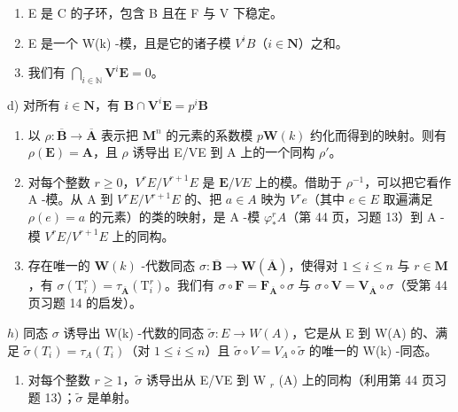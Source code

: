\begin{enumerate}
\def\labelenumi{\alph{enumi})}
\item
  E 是 C 的子环，包含 B 且在 F 与 V 下稳定。
\item
  E 是一个 W(k) -模，且是它的诸子模 \(V^iB\)（\(i \in \mathbf{N}\)）之和。
\item
  我们有 \(\bigcap_{i\in\mathbb{N}}\mathbf{V}^{i}\mathbf{E} = 0\)。
\end{enumerate}

d) 对所有 \(i\in \mathbf{N}\)，有 \(\mathbf{B}\cap \mathbf{V}^i\mathbf{E} = p^i\mathbf{B}\)

\begin{enumerate}
\def\labelenumi{\alph{enumi})}
\setcounter{enumi}{4}
\item
  以 \(\rho: \overline{\mathbf{B}} \to \overline{\mathbf{A}}\) 表示把 \(\mathbf{M}^n\) 的元素的系数模 \(p\mathbf{W}(k)\) 约化而得到的映射。则有 \(\rho(\mathbf{E}) = \mathbf{A}\)，且 \(\rho\) 诱导出 E/VE 到 A 上的一个同构 \(\rho'\)。
\item
  对每个整数 \(r \geqslant 0\)，\(V^r E / V^{r+1}E\) 是 \(\mathbf{E} / VE\) 上的模。借助于 \(\rho^{-1}\)，可以把它看作 A -模。从 A 到 \(V^r E / V^{r+1}E\) 的、把 \(a \in A\) 映为 \(V^r e\)（其中 \(e \in E\) 取遍满足 \(\rho(e) = a\) 的元素）的类的映射，是 A -模 \(\varphi_*^r A\)（第 44 页，习题 13）到 A -模 \(V^r E / V^{r+1}E\) 上的同构。
\item
  存在唯一的 \(\mathbf{W}(k)\) -代数同态 \(\sigma: \overline{\mathbf{B}} \to \mathbf{W}(\overline{\mathbf{A}})\)，使得对 \(1 \leqslant i \leqslant n\) 与 \(r \in \mathbf{M}\)，有 \(\sigma(\mathrm{T}_i^r) = \tau_{\overline{\mathbf{A}}}(\mathrm{T}_i^r)\)。我们有 \(\sigma \circ \mathbf{F} = \mathbf{F}_{\overline{\mathbf{A}}} \circ \sigma\) 与 \(\sigma \circ \mathbf{V} = \mathbf{V}_{\overline{\mathbf{A}}} \circ \sigma\)（受第 44 页习题 14 的启发）。
\end{enumerate}

\(h)\) 同态 \(\sigma\) 诱导出 W(k) -代数的同态 \(\tilde{\sigma}: E \to W(A)\)，它是从 E 到 W(A) 的、满足 \(\tilde{\sigma}(T_i) = \tau_A(T_i)\)（对 \(1 \leqslant i \leqslant n\)）且 \(\tilde{\sigma} \circ V = V_A \circ \tilde{\sigma}\) 的唯一的 W(k) -同态。

\begin{enumerate}
\def\labelenumi{\roman{enumi})}
\tightlist
\item
  对每个整数 \(r \geqslant 1\)，\(\tilde{\sigma}\) 诱导出从 E/VE 到 W \(_{r}\) (A) 上的同构（利用第 44 页习题 13）；\(\tilde{\sigma}\) 是单射。
\end{enumerate}

